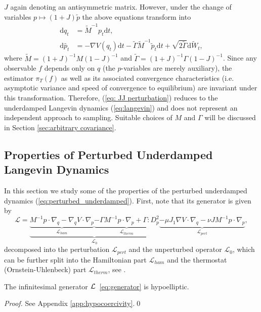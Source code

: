 $J$ again denoting an antisymmetric matrix. However, under the change
of variables $p\mapsto(1+J)\tilde{p}$ the above equations transform
into 
\begin{align*}
\mathrm{d}q_{t} & =\tilde{M}^{-1}p_{t}\mathrm{d}t,\\
\mathrm{d}\tilde{p_{t}} & =-\nabla V(q_{t})\mathrm{d}t-\tilde{\Gamma}\tilde{M}^{-1}\tilde{p}_{t}\mathrm{d}t+\sqrt{2\tilde{\Gamma}}\mathrm{d}\tilde{W}_{t},
\end{align*}
where $\tilde{M}=(1+J)^{-1}M(1-J)^{-1}$ and $\tilde{\Gamma}=(1+J)^{-1}\Gamma(1-J)^{-1}$.
Since any observable $f$ depends only on $q$ (the $p$-variables
are merely auxiliary), the estimator $\pi_T(f)$ as well as its associated convergence characteristics (i.e. asymptotic
variance and speed of convergence to equilibrium) are invariant under this transformation.
Therefore, (\ref{eq: JJ perturbation}) reduces to the underdamped
Langevin dynamics (\ref{eq:langevin}) and does not represent an independent approach to sampling. Suitable choices
of $M$ and $\Gamma$ will be discussed in Section \ref{sec:arbitrary covariance}.

\subsection{Properties of Perturbed Underdamped Langevin Dynamics}
\label{sec:hypocoercivity}

In this section we study some of the properties of the perturbed underdamped dynamics (\ref{eq:perturbed_underdamped}). First, note that its generator is given by
\begin{equation}
\label{eq:generator}
\mathcal{L}=\underbrace{\underbrace{M^{-1}p\cdot\nabla_{q}-\nabla_{q}V\cdot\nabla_{p}}_{\mathcal{L}_{ham}}\underbrace{-\Gamma M^{-1}p\cdot\nabla_{p}+\Gamma : D^2_{p}}_{\mathcal{L}_{therm}}}_{\mathcal{L}_0} \underbrace{-\mu J_{1}\nabla V \cdot \nabla_{q} - \nu J M^{-1} p \cdot \nabla_{p}}_{\mathcal{L}_{pert}},
\end{equation}	
decomposed into the perturbation $\mathcal{L}_{pert}$ and the unperturbed operator $\mathcal{L}_0$, which can be further split into the Hamiltonian part $\mathcal{L}_{ham}$ and the thermostat (Ornstein-Uhlenbeck) part $\mathcal{L}_{therm}$, see \cite{pavliotis2014stochastic,Free_energy_computations,LS2016}.

\begin{lemma}
\label{lem:hypoellipticity}
	The infinitesimal generator $\operatorname{\mathcal{L}}$~\eqref{eq:generator} is hypoelliptic.
\end{lemma}
\begin{proof}
	See Appendix \ref{app:hypocoercivity}.\qed
\end{proof}

